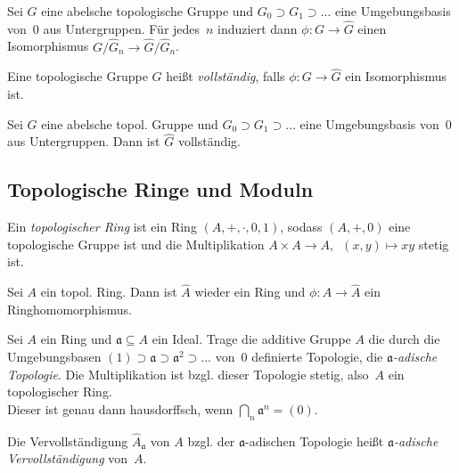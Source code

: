 \documentclass{cheat-sheet}
\newcommand{\aaa}{\mathfrak{a}}
\begin{document}
\begin{kor}
  Sei $G$ eine abelsche topologische Gruppe und $G_0 \supset G_1 \supset \ldots$ eine Umgebungsbasis von~$0$ aus Untergruppen.
  Für jedes~$n$ induziert dann $\phi : G \to \hat{G}$ einen Isomorphismus $G/\hat{G}_n \to \hat{G} / \hat{G}_n$.
\end{kor}

\begin{defn}
  Eine topologische Gruppe $G$ heißt \emph{vollständig}, falls $\phi : G \to \hat{G}$ ein Isomorphismus ist.
\end{defn}

\begin{prop}
  Sei $G$ eine abelsche topol. Gruppe und $G_0 \supset G_1 \supset \ldots$ eine Umgebungsbasis von~$0$ aus Untergruppen.
  Dann ist $\hat{G}$ vollständig.
\end{prop}

\subsection{Topologische Ringe und Moduln}

\begin{defn}
  Ein \emph{topologischer Ring} ist ein Ring $(A, +, \cdot, 0, 1)$, sodass $(A, +, 0)$ eine topologische Gruppe ist und die Multiplikation $A \times A \to A, \enspace (x, y) \mapsto xy$ stetig ist.
\end{defn}

\begin{bem}
  Sei $A$ ein topol. Ring.
  Dann ist $\hat{A}$ wieder ein Ring und $\phi : A \to \hat{A}$ ein Ringhomomorphismus.
\end{bem}

\begin{konstr}
  Sei $A$ ein Ring und $\aaa \subseteq A$ ein Ideal.
  Trage die additive Gruppe $A$ die durch die Umgebungsbasen $(1) \supset \aaa \supset \aaa^2 \supset \ldots$ von~$0$ definierte Topologie, die \emph{$\aaa$-adische Topologie}.
  Die Multiplikation ist bzgl. dieser Topologie stetig, also~$A$ ein topologischer Ring. \\
  Dieser ist genau dann hausdorffsch, wenn ${\bigcap}_n \aaa^n = (0)$.
\end{konstr}

\begin{defn}
  Die Vervollständigung $\hat{A}_\aaa$ von $A$ bzgl. der $\aaa$-adischen Topologie heißt \emph{$\aaa$-adische Vervollständigung} von~$A$.
\end{defn}
\end{document}
